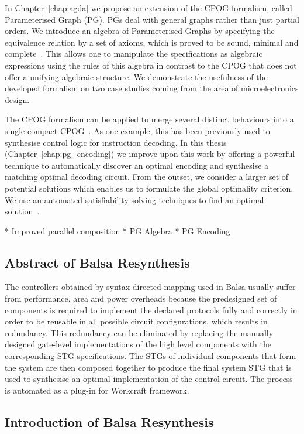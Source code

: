 In Chapter~\ref{chap:agda} we propose an extension of the CPOG formalism, called Parameterised Graph (PG).
PGs deal with general graphs rather than just partial orders. We introduce an algebra of Parameterised Graphs by specifying the
equivalence relation by a set of axioms, which is proved to be sound,
minimal and complete~\cite{pg_algebra}. This allows one to manipulate the specifications
as algebraic expressions using the rules of this algebra in contrast to the CPOG that does not offer a unifying algebraic structure. We demonstrate
the usefulness of the developed formalism on two case studies coming
from the area of microelectronics design.

The CPOG formalism can be applied to merge several distinct behaviours
into a single compact CPOG~\cite{2009_mokhov_phd}. As one example, this has been previously used to
synthesise control logic for instruction decoding. In this thesis (Chapter~\ref{chap:pg_encoding}) 
we improve upon this work by offering a powerful technique to automatically discover an optimal encoding and
synthesise a matching optimal decoding circuit. From the outset, we consider a larger set of potential solutions
which enables us to formulate the global optimality criterion. We use an automated satisfiability solving 
techniques to find an optimal solution~\cite{pg_encoding}.




* Improved parallel composition
* PG Algebra
* PG Encoding

\subsection{Abstract of Balsa Resynthesis}

The controllers obtained
by syntax-directed mapping used in Balsa usually suffer from performance,
area and power overheads because the predesigned set of components
is required to implement the declared protocols fully and correctly
in order to be reusable in all possible circuit configurations, which
results in redundancy. This redundancy can be eliminated by replacing
the manually designed gate-level implementations of the high level
components with the corresponding STG specifications. The STGs of
individual components that form the system are then composed together
to produce the final system STG that is used to synthesise an optimal
implementation of the control circuit. The process is automated as
a plug-in for Workcraft framework.

\subsection{Introduction of Balsa Resynthesis\label{sec:Balsa-Introduction}}

